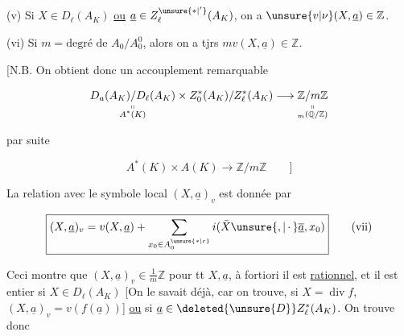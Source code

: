(v) Si $X\in D_\ell(A_K)$ \uline{ou} $\underline a\in Z_\ell^{\unsure{*|'}}(A_K)$, on a
$\unsure{v|\nu}(X,\underline a)\in\mathbb Z$.


(vi) Si $m={}\text{degré de }A_0/A_0^0$, alors on a
tjrs $m v(X,\underline a)\in\mathbb Z$.

[N.B. On obtient donc  un accouplement remarquable

\[
\underset{\substack{\shortparallel\\ A^*(K)}}{D_a(A_K)/D_\ell(A_K)}
 \times Z_0^*(A_K)/Z_\ell^*(A_K)\longrightarrow
 \underset{\substack{\shortparallel\\ {}_m(\mathbb Q/\mathbb Z)}}{\mathbb Z/m\mathbb Z}
\]


 par suite

\[
 A^*(K)\times A(K)\longrightarrow\mathbb Z/m\mathbb Z \qquad ]\tag*{$*$}
\]

La relation avec le symbole local $(X,\underline a)_v$ est
donnée par

\[
 \boxed{(X,\underline a)_v=v(X,\underline a)+\sum_{x_0\in A_0^{\unsure{*|c}}}i(\bar X\unsure{,|\,\cdot\,}\overline{\underline a},x_0)}\tag*{(vii)}
\]


Ceci montre que $(X,\underline a)_v\in\frac{1}{m}\mathbb Z$ pour tt $X,\underline a$,
 à fortiori il est \uline{rationnel}, et il est
entier si $X\in D_\ell(A_K)$ [On le savait
déjà, car on trouve, si $X=\operatorname{div} f$, $(X,\underline a)_v=v(f(\underline a))$]
\uline{ou} si $\underline a\in\deleted{\unsure{D}}Z_\ell^*(A_K)$. On trouve donc
